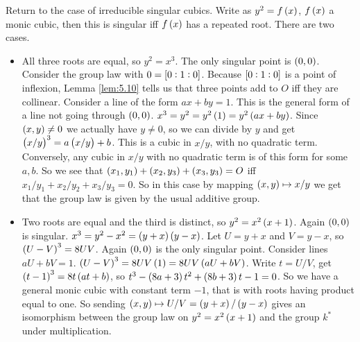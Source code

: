Return to the case of irreducible singular cubics. Write as $ y^2 = f\br{x} $, $ f\br{x} $ a monic cubic, then this is singular iff $ f\br{x} $ has a repeated root. There are two cases.
\begin{itemize}
\item All three roots are equal, so $ y^2 = x^3 $. The only singular point is $ \br{0, 0} $. Consider the group law with $ 0 = \sbr{0 : 1 : 0} $. Because $ \sbr{0 : 1 : 0} $ is a point of inflexion, Lemma \ref{lem:5.10} tells us that three points add to $ O $ iff they are collinear. Consider a line of the form $ ax + by = 1 $. This is the general form of a line not going through $ \br{0, 0} $. $ x^3 = y^2 = y^2\br{1} = y^2\br{ax + by} $. Since $ \br{x, y} \ne 0 $ we actually have $ y \ne 0 $, so we can divide by $ y $ and get $ \br{x / y}^3 = a\br{x / y} + b $. This is a cubic in $ x / y $, with no quadratic term. Conversely, any cubic in $ x / y $ with no quadratic term is of this form for some $ a, b $. So we see that $ \br{x_1, y_1} + \br{x_2, y_3} + \br{x_3, y_3} = O $ iff $ x_1 / y_1 + x_2 / y_2 + x_3 / y_3 = 0 $. So in this case by mapping $ \br{x, y} \mapsto x / y $ we get that the group law is given by the usual additive group.

\pagebreak

\item Two roots are equal and the third is distinct, so $ y^2 = x^2\br{x + 1} $. Again $ \br{0, 0} $ is singular. $ x^3 = y^2 - x^2 = \br{y + x}\br{y - x} $. Let $ U = y + x $ and $ V = y - x $, so $ \br{U - V}^3 = 8UV $. Again $ \br{0, 0} $ is the only singular point. Consider lines $ aU + bV = 1 $. $ \br{U - V}^3 = 8UV\br{1} = 8UV\br{aU + bV} $. Write $ t = U / V $, get $ \br{t - 1}^3 = 8t\br{at + b} $, so $ t^3 - \br{8a + 3}t^2 + \br{8b + 3}t - 1 = 0 $. So we have a general monic cubic with constant term $ -1 $, that is with roots having product equal to one. So sending $ \br{x, y} \mapsto U / V = \br{y + x} / \br{y - x} $ gives an isomorphism between the group law on $ y^2 = x^2\br{x + 1} $ and the group $ k^* $ under multiplication.
\end{itemize}


